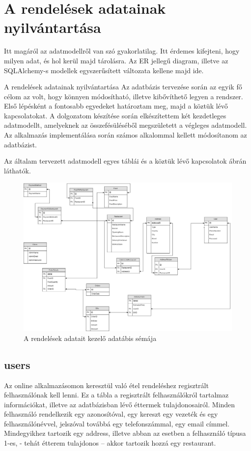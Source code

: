 \chapter{A rendelések adatainak nyilvántartása}

Itt magáról az adatmodellről van szó gyakorlatilag. Itt érdemes kifejteni, hogy milyen adat, és hol kerül majd tárolásra. Az ER jellegű diagram, illetve az SQLAlchemy-s modellek egyszerűsített változata kellene majd ide.

A rendelések adatainak nyilvántartása
Az adatbázis tervezése során az egyik fő célom az volt, hogy könnyen módosítható, illetve kibővíthető legyen a rendszer. Első lépésként a fontosabb egyedeket határoztam meg, majd a köztük lévő kapcsolatokat. A dolgozatom készítése során elkészítettem két kezdetleges adatmodellt, amelyeknek az összefésüléséből megszületett a végleges adatmodell. Az alkalmazás implementálása során számos alkalommal kellett módosítanom az adatbázist.

Az általam tervezett adatmodell egyes táblái és a köztük lévő kapcsolatok  ábrán láthatók.

\begin{figure}
\includegraphics[scale=0.3]{kepek/rendeles_sema.jpg}
\caption{A rendelések adatait kezelő adatábis sémája}
\label{fig:rendeles_sema}
\end{figure}

\section{users}

Az online alkalmazásomon keresztül való étel rendeléshez regisztrált felhasználónak kell lenni. Ez a tábla a regisztrált felhasználókról tartalmaz információkat, illetve az adatbázisban lévő éttermek tulajdonosairól. Minden felhasználó rendelkezik egy azonosítóval, egy kereszt egy vezeték és egy felhasználónévvel, jelszóval továbbá egy telefonszámmal, egy email címmel. Mindegyikhez tartozik egy address, illetve abban az esetben a felhasználó típusa 1-es, - tehát étterem tulajdonos – akkor tartozik hozzá egy restaurant.

